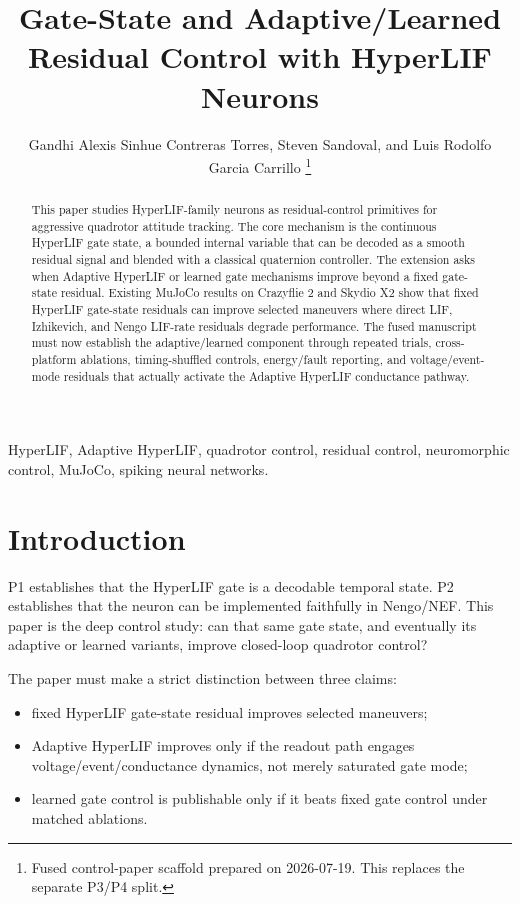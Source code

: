 \documentclass[journal]{IEEEtran}
\title{Gate-State and Adaptive/Learned Residual Control with HyperLIF Neurons}
\author{Gandhi Alexis Sinhue Contreras Torres, Steven Sandoval, and Luis Rodolfo Garcia Carrillo%
\thanks{Fused control-paper scaffold prepared on 2026-07-19. This replaces the separate P3/P4 split.}}
\begin{document}
\maketitle

\begin{abstract}
This paper studies HyperLIF-family neurons as residual-control primitives for aggressive quadrotor attitude tracking. The core mechanism is the continuous HyperLIF gate state, a bounded internal variable that can be decoded as a smooth residual signal and blended with a classical quaternion controller. The extension asks when Adaptive HyperLIF or learned gate mechanisms improve beyond a fixed gate-state residual. Existing MuJoCo results on Crazyflie 2 and Skydio X2 show that fixed HyperLIF gate-state residuals can improve selected maneuvers where direct LIF, Izhikevich, and Nengo LIF-rate residuals degrade performance. The fused manuscript must now establish the adaptive/learned component through repeated trials, cross-platform ablations, timing-shuffled controls, energy/fault reporting, and voltage/event-mode residuals that actually activate the Adaptive HyperLIF conductance pathway.
\end{abstract}

\begin{IEEEkeywords}
HyperLIF, Adaptive HyperLIF, quadrotor control, residual control, neuromorphic control, MuJoCo, spiking neural networks.
\end{IEEEkeywords}

\section{Introduction}
P1 establishes that the HyperLIF gate is a decodable temporal state. P2 establishes that the neuron can be implemented faithfully in Nengo/NEF. This paper is the deep control study: can that same gate state, and eventually its adaptive or learned variants, improve closed-loop quadrotor control?

The paper must make a strict distinction between three claims:
\begin{itemize}
  \item fixed HyperLIF gate-state residual improves selected maneuvers;
  \item Adaptive HyperLIF improves only if the readout path engages voltage/event/conductance dynamics, not merely saturated gate mode;
  \item learned gate control is publishable only if it beats fixed gate control under matched ablations.
\end{itemize}
\end{document}
